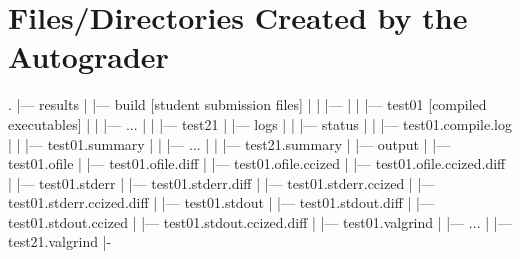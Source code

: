 \documentclass[11pt]{report}
\begin{document}
\section*{Files/Directories Created by the Autograder}
\begin{bashcodeblock}
.
|--- results
|   |--- build      [student submission files]
|   |   |--- 
|   |   |--- test01 [compiled executables]
|   |   |--- ...
|   |   |--- test21
|   |--- logs
|   |   |--- status
|   |   |--- test01.compile.log
|   |   |--- test01.summary
|   |   |--- ...
|   |   |--- test21.summary
|   |--- output
|       |--- test01.ofile
|       |--- test01.ofile.diff
|       |--- test01.ofile.ccized
|       |--- test01.ofile.ccized.diff
|       |--- test01.stderr
|       |--- test01.stderr.diff
|       |--- test01.stderr.ccized
|       |--- test01.stderr.ccized.diff 
|       |--- test01.stdout
|       |--- test01.stdout.diff
|       |--- test01.stdout.ccized
|       |--- test01.stdout.ccized.diff
|       |--- test01.valgrind
|       |--- ...
|       |--- test21.valgrind
|-
\end{bashcodeblock}
\end{document}
